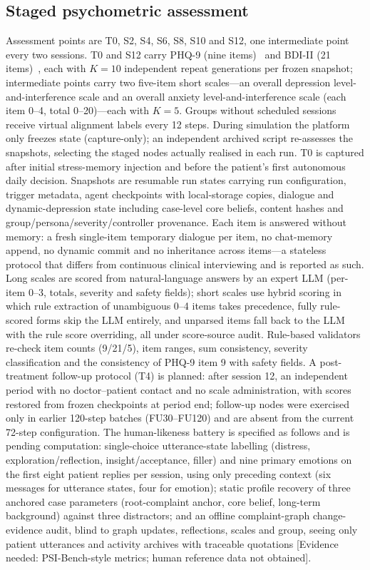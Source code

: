 \documentclass[sn-nature,pdflatex]{sn-jnl}
\begin{document}
\subsection*{Staged psychometric assessment}

Assessment points are T0, S2, S4, S6, S8, S10 and S12, one intermediate point every two sessions. T0 and S12 carry PHQ-9 (nine items)~\cite{kroenke2001} and BDI-II (21 items)~\cite{beck1996}, each with $K=10$ independent repeat generations per frozen snapshot; intermediate points carry two five-item short scales---an overall depression level-and-interference scale and an overall anxiety level-and-interference scale (each item 0--4, total 0--20)---each with $K=5$. Groups without scheduled sessions receive virtual alignment labels every 12 steps. During simulation the platform only freezes state (capture-only); an independent archived script re-assesses the snapshots, selecting the staged nodes actually realised in each run. T0 is captured after initial stress-memory injection and before the patient's first autonomous daily decision. Snapshots are resumable run states carrying run configuration, trigger metadata, agent checkpoints with local-storage copies, dialogue and dynamic-depression state including case-level core beliefs, content hashes and group/persona/severity/controller provenance. Each item is answered without memory: a fresh single-item temporary dialogue per item, no chat-memory append, no dynamic commit and no inheritance across items---a stateless protocol that differs from continuous clinical interviewing and is reported as such. Long scales are scored from natural-language answers by an expert LLM (per-item 0--3, totals, severity and safety fields); short scales use hybrid scoring in which rule extraction of unambiguous 0--4 items takes precedence, fully rule-scored forms skip the LLM entirely, and unparsed items fall back to the LLM with the rule score overriding, all under score-source audit. Rule-based validators re-check item counts (9/21/5), item ranges, sum consistency, severity classification and the consistency of PHQ-9 item 9 with safety fields. A post-treatment follow-up protocol (T4) is planned: after session 12, an independent period with no doctor--patient contact and no scale administration, with scores restored from frozen checkpoints at period end; follow-up nodes were exercised only in earlier 120-step batches (FU30--FU120) and are absent from the current 72-step configuration. The human-likeness battery is specified as follows and is pending computation: single-choice utterance-state labelling (distress, exploration/reflection, insight/acceptance, filler) and nine primary emotions on the first eight patient replies per session, using only preceding context (six messages for utterance states, four for emotion); static profile recovery of three anchored case parameters (root-complaint anchor, core belief, long-term background) against three distractors; and an offline complaint-graph change-evidence audit, blind to graph updates, reflections, scales and group, seeing only patient utterances and activity archives with traceable quotations [Evidence needed: PSI-Bench-style metrics; human reference data not obtained].
\end{document}
